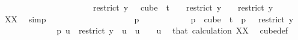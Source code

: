 \begin{isabellebody}
\ \ \ \ \ \ \ \ \isamarkupfalse%
\ \isanewline
\ \ \ \ \ \ \ \ \ \ \isamarkupfalse%
\ {\isachardoublequoteopen}restrict\ y\ {\isacharbraceleft}{\kern0pt}{\isachardot}{\kern0pt}{\isachardot}{\kern0pt}{\isacharless}{\kern0pt}{}{\isacharbraceright}{\kern0pt}\ {\isasymin}\ cube\ {}\ {\isacharparenleft}{\kern0pt}t\ {\isacharplus}{\kern0pt}\ {}{\isacharparenright}{\kern0pt}\ {\isasymand}\ restrict\ y\ {\isacharbraceleft}{\kern0pt}{\isachardot}{\kern0pt}{\isachardot}{\kern0pt}{\isacharless}{\kern0pt}{}{\isacharbraceright}{\kern0pt}\ {}\ {\isacharequal}{\kern0pt}\ restrict\ y\ {\isacharbraceleft}{\kern0pt}{\isachardot}{\kern0pt}{\isachardot}{\kern0pt}{\isacharless}{\kern0pt}{}{\isacharbraceright}{\kern0pt}\ {}{\isachardoublequoteclose}\ \isamarkupfalse%
\ XX\ \isamarkupfalse%
\ simp\isanewline
\ \ \ \ \ \ \ \ \isamarkupfalse%
\isanewline
\ \ \ \ \ \ \ \ \ \ \isamarkupfalse%
\ p\isanewline
\ \ \ \ \ \ \ \ \ \ \isamarkupfalse%
\ {\isachardoublequoteopen}p\ {\isasymin}\ cube\ {}\ {\isacharparenleft}{\kern0pt}t{\isacharplus}{\kern0pt}{}{\isacharparenright}{\kern0pt}\ {\isasymand}\ p\ {}\ {\isacharequal}{\kern0pt}\ restrict\ y\ {\isacharbraceleft}{\kern0pt}{\isachardot}{\kern0pt}{\isachardot}{\kern0pt}{\isacharless}{\kern0pt}{}{\isacharbraceright}{\kern0pt}\ {}{\isachardoublequoteclose}\isanewline
\ \ \ \ \ \ \ \ \ \ \isamarkupfalse%
\ \isamarkupfalse%
\ {\isachardoublequoteopen}p\ u\ {\isacharequal}{\kern0pt}\ restrict\ y\ {\isacharbraceleft}{\kern0pt}{\isachardot}{\kern0pt}{\isachardot}{\kern0pt}{\isacharless}{\kern0pt}{}{\isacharbraceright}{\kern0pt}\ u{\isachardoublequoteclose}\ \ {\isachardoublequoteopen}u\ {\isasymnotin}\ {\isacharbraceleft}{\kern0pt}{\isachardot}{\kern0pt}{\isachardot}{\kern0pt}{\isacharless}{\kern0pt}{}{\isacharbraceright}{\kern0pt}{\isachardoublequoteclose}\ \ u\ \isamarkupfalse%
\ that\ calculation\ XX\ \isamarkupfalse%
\ cube{\isacharunderscore}{\kern0pt}def\ \isamarkupfalse%

\end{isabellebody}
